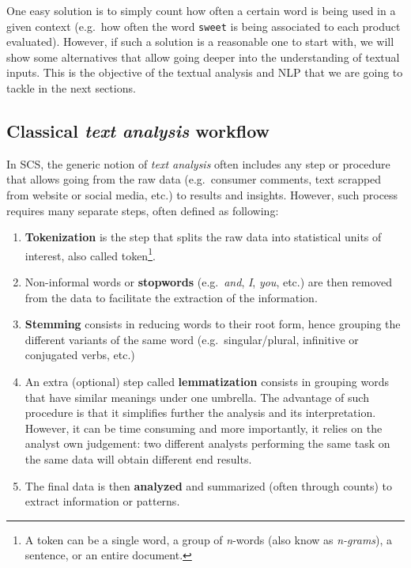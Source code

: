 \documentclass[
]{krantz}
\providecommand{\tightlist}{%
  \setlength{\itemsep}{0pt}\setlength{\parskip}{0pt}}
\begin{document}
One easy solution is to simply count how often a certain word is being used in a given context (e.g.~how often the word \texttt{sweet} is being associated to each product evaluated). However, if such a solution is a reasonable one to start with, we will show some alternatives that allow going deeper into the understanding of textual inputs. This is the objective of the textual analysis and NLP that we are going to tackle in the next sections.

\hypertarget{classical-text-analysis-workflow}{%
\subsection{\texorpdfstring{Classical \emph{text analysis} workflow}{Classical text analysis workflow}}\label{classical-text-analysis-workflow}}

In SCS, the generic notion of \emph{text analysis} often includes any step or procedure that allows going from the raw data (e.g.~consumer comments, text scrapped from website or social media, etc.) to results and insights. However, such process requires many separate steps, often defined as following:

\begin{enumerate}
\def\labelenumi{\arabic{enumi}.}
\tightlist
\item
  \textbf{Tokenization} is the step that splits the raw data into statistical units of interest, also called token\footnote{A token can be a single word, a group of \emph{n}-words (also know as \emph{n-grams}), a sentence, or an entire document.}.
\item
  Non-informal words or \textbf{stopwords} (e.g.~\emph{and}, \emph{I}, \emph{you}, etc.) are then removed from the data to facilitate the extraction of the information.
\item
  \textbf{Stemming} consists in reducing words to their root form, hence grouping the different variants of the same word (e.g.~singular/plural, infinitive or conjugated verbs, etc.)
\item
  An extra (optional) step called \textbf{lemmatization} consists in grouping words that have similar meanings under one umbrella. The advantage of such procedure is that it simplifies further the analysis and its interpretation. However, it can be time consuming and more importantly, it relies on the analyst own judgement: two different analysts performing the same task on the same data will obtain different end results.
\item
  The final data is then \textbf{analyzed} and summarized (often through counts) to extract information or patterns.
\end{enumerate}
\end{document}
